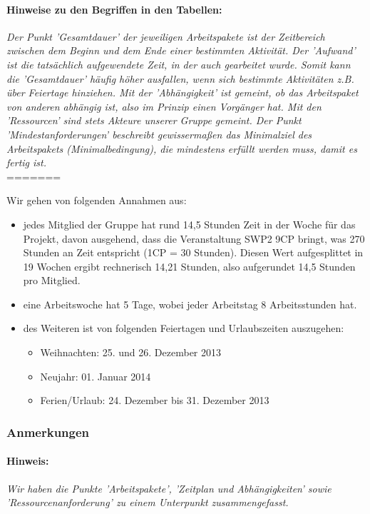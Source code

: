 \documentclass[fontsize=12pt,paper=a4,twoside]{scrartcl}
\begin{document}
\paragraph{Hinweise zu den Begriffen in den Tabellen:} \textit{Der Punkt 'Gesamtdauer' der jeweiligen Arbeitspakete ist der Zeitbereich zwischen dem Beginn und dem Ende einer bestimmten Aktivität. Der 'Aufwand' ist die tatsächlich aufgewendete Zeit, in der auch gearbeitet wurde. Somit kann die 'Gesamtdauer' häufig höher ausfallen, wenn sich bestimmte Aktivitäten z.B. über Feiertage hinziehen. Mit der 'Abhängigkeit' ist gemeint, ob das Arbeitspaket von anderen abhängig ist, also im Prinzip einen Vorgänger hat. Mit den 'Ressourcen' sind stets Akteure unserer Gruppe gemeint. Der Punkt 'Mindestanforderungen' beschreibt gewissermaßen das Minimalziel des Arbeitspakets (Minimalbedingung), die mindestens erfüllt werden muss, damit es fertig ist.}\\

=======

Wir gehen von folgenden Annahmen aus: \\
\begin{itemize}
\item jedes Mitglied der Gruppe hat rund 14,5 Stunden Zeit in der Woche für das Projekt, davon ausgehend, dass die Veranstaltung SWP2 9CP bringt, was 270 Stunden an Zeit entspricht (1CP = 30 Stunden). Diesen Wert aufgesplittet in 19 Wochen ergibt rechnerisch 14,21 Stunden, also aufgerundet 14,5 Stunden pro Mitglied.

\item eine Arbeitswoche hat 5 Tage, wobei jeder Arbeitstag 8 Arbeitsstunden hat.

\item des Weiteren ist von folgenden Feiertagen und Urlaubszeiten auszugehen:
\begin{itemize}
\item Weihnachten: 25. und 26. Dezember 2013
\item Neujahr: 01. Januar 2014
\item Ferien/Urlaub: 24. Dezember bis 31. Dezember 2013
\end{itemize}
\end{itemize}
\subsubsection{Anmerkungen}\label{aps}
\paragraph{Hinweis:} \textit{Wir haben die Punkte 'Arbeitspakete', 'Zeitplan und Abhängigkeiten' sowie 'Ressourcenanforderung' zu einem Unterpunkt zusammengefasst.}\\
\end{document}
